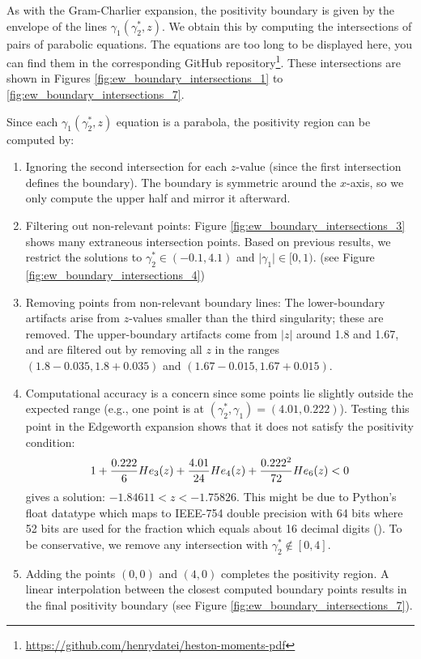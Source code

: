 As with the Gram-Charlier expansion, the positivity boundary is given by the envelope of the lines $\gamma_1(\gamma_2^*, z)$. We obtain this by computing the intersections of pairs of parabolic equations. The equations are too long to be displayed here, you can find them in the corresponding GitHub repository\footnote{\url{https://github.com/henrydatei/heston-moments-pdf}}. These intersections are shown in Figures \ref{fig:ew_boundary_intersections_1} to \ref{fig:ew_boundary_intersections_7}.

Since each $\gamma_1(\gamma_2^*, z)$ equation is a parabola, the positivity region can be computed by:
\begin{enumerate}
    \item Ignoring the second intersection for each $z$-value (since the first intersection defines the boundary). The boundary is symmetric around the $x$-axis, so we only compute the upper half and mirror it afterward.
    \item Filtering out non-relevant points: Figure \ref{fig:ew_boundary_intersections_3} shows many extraneous intersection points. Based on previous results, we restrict the solutions to $\gamma_2^* \in (-0.1,4.1)$ and $\vert \gamma_1\vert \in [0,1)$. (see Figure \ref{fig:ew_boundary_intersections_4})
    \item Removing points from non-relevant boundary lines: The lower-boundary artifacts arise from $z$-values smaller than the third singularity; these are removed. The upper-boundary artifacts come from $\vert z \vert$ around 1.8 and 1.67, and are filtered out by removing all $z$ in the ranges $(1.8-0.035, 1.8+0.035)$ and $(1.67-0.015,1.67+0.015)$.
    \item Computational accuracy is a concern since some points lie slightly outside the expected range (e.g., one point is at $(\gamma_2^*, \gamma_1) = (4.01, 0.222)$). Testing this point in the Edgeworth expansion shows that it does not satisfy the positivity condition:
    \begin{align}
        1 + \frac{0.222}{6}He_3(z) + \frac{4.01}{24}He_4(z) + \frac{0.222^2}{72}He_6(z)<0 \notag
    \end{align}
    gives a solution: $-1.84611<z<-1.75826$. This might be due to Python's float datatype which maps to IEEE-754 double precision with 64 bits where 52 bits are used for the fraction which equals about 16 decimal digits (\cite{pythonfoundation15FloatingPointArithmetic,leonardo.zAnswerHowCan2013}). To be conservative, we remove any intersection with $\gamma_2^* \notin [0,4]$.
    \item Adding the points $(0,0)$ and $(4,0)$ completes the positivity region. A linear interpolation between the closest computed boundary points results in the final positivity boundary (see Figure \ref{fig:ew_boundary_intersections_7}).
\end{enumerate}

